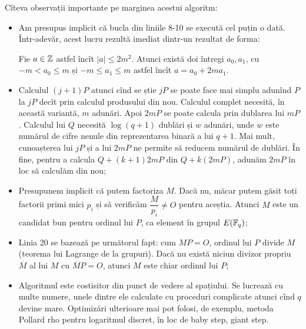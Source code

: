 Cîteva observații importante pe marginea acestui algoritm:
\begin{itemize}
\item Am presupus implicit că bucla din liniile 8-10 se execută cel puțin o dată.
  Într-adevăr, acest lucru rezultă imediat dintr-un rezultat de forma:
  \begin{lemma}\label{le:alg-bsgs}
    Fie $ a \in \mathbb{Z} $ astfel încît $ |a| \leq 2m^2 $. Atunci există doi întregi
    $ a_0, a_1 $, cu $ -m < a_0 \leq m $ și $ -m \leq a_1 \leq m $ astfel încît
    $ a = a_0 + 2ma_1 $.
  \end{lemma}
\item Calculul $ (j + 1) P $ atunci cînd se știe $ jP $ se poate face mai simplu
  adunînd $ P $ la $ jP $ decît prin calculul produsului din nou. Calculul complet
  necesită, în această variantă, $ m $ adunări. Apoi $ 2mP $ se poate calcula prin
  dublarea lui $ mP $. Calculul lui $ Q $ necesită $ \log(q + 1) $ dublări
  și $ w $ adunări, unde $ w $ este numărul de cifre nenule din reprezentarea
  binară a lui $ q + 1 $. Mai mult, cunoașterea lui $ jP $ și a lui $ 2mP $
  ne permite să reducem numărul de dublări. În fine, pentru a calcula
  $ Q + (k + 1) 2mP $ din $ Q + k(2mP) $, adunăm $ 2mP $ în loc să calculăm
  din nou;
\item Presupunem implicit că putem factoriza $ M $. Dacă nu, măcar putem
  găsit toți factorii primi mici $ p_i $ și să verificăm $ \dfrac{M}{p_i} \neq O $
  pentru aceștia. Atunci $ M $ este un candidat bun pentru ordinul lui $ P $,
  ca element în grupul $ E(\mathbb{F}_q) $;
\item Linia 20 se bazează pe următorul fapt: cum $ MP = O $, ordinul lui $ P $
  divide $ M $ (teorema lui Lagrange de la grupuri). Dacă nu există niciun
  divizor propriu $ \overline{M} $ al lui $ M $ cu $ \overline{M}P = O $,
  atunci $ M $ este chiar ordinul lui $ P $;
\item Algoritmul este costisitor din punct de vedere al spațiului. Se lucrează
  cu multe numere, unele dintre ele calculate cu proceduri complicate atunci
  cînd $ q $ devine mare. Optimizări ulterioare mai pot folosi,
  de exemplu, metoda Pollard rho pentru logaritmul discret, în loc
  de baby step, giant step.
\end{itemize}
  



